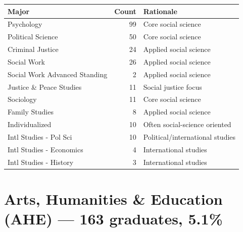 \documentclass[
  11pt,
  letterpaper,
]{report}
\begin{document}
\begin{longtable}[]{@{}lrl@{}}
\toprule\noalign{}
Major & Count & Rationale \\
\midrule\noalign{}
\endhead
\bottomrule\noalign{}
\endlastfoot
Psychology & 99 & Core social science \\
Political Science & 50 & Core social science \\
Criminal Justice & 24 & Applied social science \\
Social Work & 26 & Applied social science \\
Social Work Advanced Standing & 2 & Applied social science \\
Justice \& Peace Studies & 11 & Social justice focus \\
Sociology & 11 & Core social science \\
Family Studies & 8 & Applied social science \\
Individualized & 10 & Often social-science oriented \\
Intl Studies - Pol Sci & 10 & Political/international studies \\
Intl Studies - Economics & 4 & International studies \\
Intl Studies - History & 3 & International studies \\
\end{longtable}

\section{Arts, Humanities \& Education (AHE) --- 163 graduates,
5.1\%}\label{arts-humanities-education-ahe-163-graduates-5.1}
\end{document}
